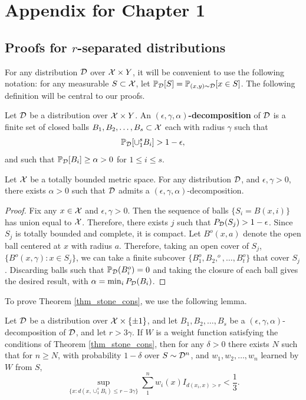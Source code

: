 \graphicspath{{./chapters/chapter1/}}
\chapter{Appendix for Chapter 1}
\section{Proofs for $r$-separated distributions}

For any distribution ${\mathcal D}$ over $\mathcal X \times Y$, it will be convenient to use the following notation: for any measurable $S \subset \mathcal X$, let $\mathbb{P}_{\mathcal D}[S] = \mathbb{P}_{(x,y) \sim {\mathcal D}}[x \in S]$. The following definition will be central to our proofs. 

\begin{defn}
Let ${\mathcal D}$ be a distribution over $\mathcal X \times Y$. An \textbf{$(\epsilon, \gamma, \alpha)$-decomposition} of ${\mathcal D}$ is a finite set of closed balls $B_1, B_2, \dots, B_s \subset \mathcal X$ each with radius $\gamma$ such that $$\mathbb{P}_{\mathcal D}[\cup_1^s B_i] > 1 - \epsilon,$$ and such that $\mathbb{P}_{\mathcal D}[B_i] \geq \alpha > 0$ for $1 \leq i \leq s$. 
\end{defn}


\begin{lem}\label{lem_balls}
Let $\mathcal X$ be a totally bounded metric space. For any distribution ${\mathcal D}$, and $\epsilon, \gamma > 0$, there exists $\alpha > 0$ such that ${\mathcal D}$ admits a $(\epsilon, \gamma, \alpha)$-decomposition. 
\end{lem}

\begin{proof}
Fix any $x \in \mathcal X$ and $\epsilon, \gamma > 0$. Then the sequence of balls $\{S_i = B(x, i)\}$ has union equal to $\mathcal X$. Therefore, there exists $j$ such that $P_{\mathcal D}(S_j) > 1 - \epsilon$. Since $S_j$ is totally bounded and complete, it is compact. Let $B^o(x, a)$ denote the open ball centered at $x$ with radius $a$. Therefore, taking an open cover of $S_j$, $\{B^o(x, \gamma): x \in S_j\}$, we can take a finite subcover $\{B_1^o, B_2,^o, \dots, B_t^o\}$ that cover $S_j$. Discarding balls such that $\mathbb{P}_{\mathcal D}(B_i^o) = 0$ and taking the closure of each ball gives the desired result, with $\alpha = \min_{i}P_{\mathcal D}(B_i)$.  
\end{proof}

To prove Theorem \ref{thm_stone_cons}, we use the following lemma. 

\begin{lem}\label{lem_expectation}
Let ${\mathcal D}$ be a distribution over $\mathcal X \times \{\pm 1\}$, and let $B_1, B_2, \dots, B_s$ be a $(\epsilon, \gamma, \alpha)$-decomposition of ${\mathcal D}$, and let $r > 3\gamma$. If $W$ is a weight function satisfying the conditions of Theorem \ref{thm_stone_cons}, then for any $\delta > 0$ there exists $N$ such that for $n \geq N$, with probability $1-\delta$ over $S \sim {\mathcal D}^n$, and $w_1, w_2, \dots, w_n$ learned by $W$ from $S$, $$\sup_{\{x: d(x, \cup_1^s B_i) \leq r - 3\gamma\}} \sum_1^n w_i(x)I_{d(x_i, x) > r} < \frac{1}{3}.$$
\end{lem}

